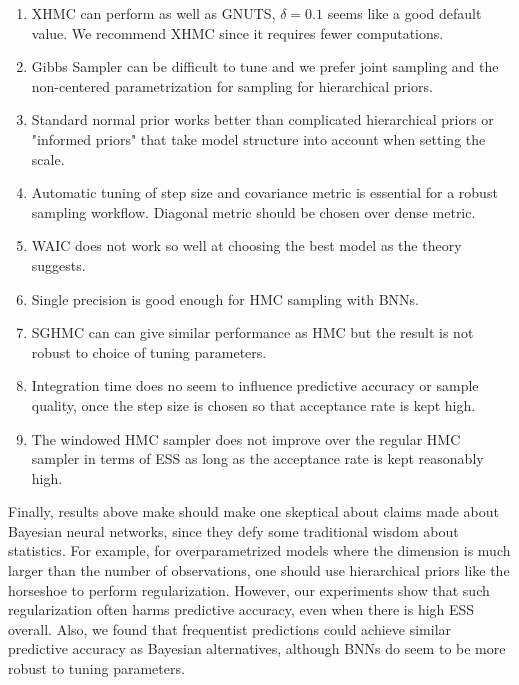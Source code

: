 \documentclass[12pt]{report}
\begin{document}
\begin{enumerate}
\item XHMC can perform as well as GNUTS, $\delta = 0.1$ seems like a good default value. We recommend XHMC since it requires fewer computations. 

\item Gibbs Sampler can be difficult to tune and we prefer joint sampling and the non-centered parametrization for sampling for hierarchical priors.

\item Standard normal prior works better than complicated hierarchical priors or "informed priors" that take model structure into account when setting the scale.

\item Automatic tuning of step size and covariance metric is essential for a robust sampling workflow. Diagonal metric should be chosen over dense metric.

\item WAIC does not work so well at choosing the best model as the theory suggests. 

\item Single precision is good enough for HMC sampling with BNNs. 

\item  SGHMC can can give similar performance as HMC but the result is not robust to choice of tuning parameters.

\item Integration time does no seem to influence predictive accuracy or sample quality, once the step size is chosen so that acceptance rate is kept high.

\item The windowed HMC sampler does not improve over the regular HMC sampler in terms of ESS as long as the acceptance rate is kept reasonably high.
\end{enumerate}

Finally, results above make should make one skeptical about claims made about Bayesian neural networks, since they defy some traditional wisdom about statistics. For example, for overparametrized models where the dimension is much larger than the number of observations, one should use hierarchical priors like the horseshoe to perform regularization. However, our experiments show that such regularization often harms predictive accuracy, even when there is high ESS overall. Also, we found that frequentist predictions could achieve similar predictive accuracy as Bayesian alternatives, although BNNs do seem to be more robust to tuning parameters.
\end{document}

